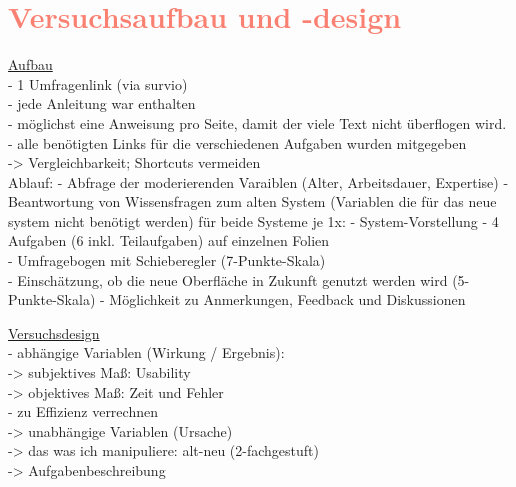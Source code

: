 \section{\textcolor{Salmon}{Versuchsaufbau und -design}}

\underline{Aufbau}\\
- 1 Umfragenlink (via survio)\\
- jede Anleitung war enthalten\\
- möglichst eine Anweisung pro Seite, damit der viele Text nicht überflogen wird.\\
- alle benötigten Links für die verschiedenen Aufgaben wurden mitgegeben\\
-> Vergleichbarkeit; Shortcuts vermeiden\\
Ablauf:
- Abfrage der moderierenden Varaiblen (Alter, Arbeitsdauer, Expertise)
- Beantwortung von Wissensfragen zum alten System (Variablen die für das neue system nicht benötigt werden)
für beide Systeme je 1x:
    - System-Vorstellung
    - 4 Aufgaben (6 inkl. Teilaufgaben) auf einzelnen Folien\\
    - Umfragebogen mit Schieberegler (7-Punkte-Skala)\\
- Einschätzung, ob die neue Oberfläche in Zukunft genutzt werden wird (5-Punkte-Skala)
- Möglichkeit zu Anmerkungen, Feedback und Diskussionen

\underline{Versuchsdesign}\\
-	abhängige Variablen (Wirkung / Ergebnis):\\
->	subjektives Maß: Usability\\
->	objektives Maß: Zeit und Fehler\\
- zu Effizienz verrechnen\\
-> unabhängige Variablen (Ursache)\\
-> das was ich manipuliere: alt-neu (2-fachgestuft)\\
->	Aufgabenbeschreibung
